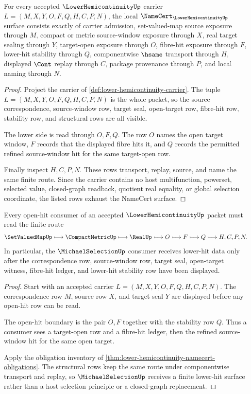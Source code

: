 \begin{theorem}
\label{thm:lower-hemicontinuity-namecert-obligations}
For every accepted $\LowerHemicontinuityUp$ carrier $L=(M,X,Y,O,F,Q,H,C,P,N)$, the local $\NameCert_{\LowerHemicontinuityUp}$ surface consists exactly of carrier admission, set-valued-map source exposure through $M$, compact or metric source-window exposure through $X$, real target sealing through $Y$, target-open exposure through $O$, fibre-hit exposure through $F$, lower-hit stability through $Q$, componentwise $\hsame$ transport through $H$, displayed $\Cont$ replay through $C$, package provenance through $P$, and local naming through $N$.
\end{theorem}
\begin{proof}
Project the carrier of \autoref{def:lower-hemicontinuity-carrier}. The tuple $L=(M,X,Y,O,F,Q,H,C,P,N)$ is the whole packet, so the source correspondence, source-window row, target seal, open-target row, fibre-hit row, stability row, and structural rows are all visible.

The lower side is read through $O,F,Q$. The row $O$ names the open target window, $F$ records that the displayed fibre hits it, and $Q$ records the permitted refined source-window hit for the same target-open row.

Finally inspect $H,C,P,N$. These rows transport, replay, source, and name the same finite route. Since the carrier contains no host multifunction, powerset, selected value, closed-graph readback, quotient real equality, or global selection coordinate, the listed rows exhaust the NameCert surface.
\end{proof}

\begin{theorem}
\label{thm:lower-hemicontinuity-open-hit-stability}
Every open-hit consumer of an accepted $\LowerHemicontinuityUp$ packet must read the finite route
$$
\SetValuedMapUp \longmapsto \CompactMetricUp \longmapsto \RealUp \longmapsto O \longmapsto F \longmapsto Q \longmapsto H,C,P,N .
$$
In particular, the $\MichaelSelectionUp$ consumer receives lower-hit data only after the correspondence row, source-window row, target seal, open-target witness, fibre-hit ledger, and lower-hit stability row have been displayed.
\end{theorem}
\begin{proof}
Start with an accepted carrier $L=(M,X,Y,O,F,Q,H,C,P,N)$. The correspondence row $M$, source row $X$, and target seal $Y$ are displayed before any open-hit row can be read.

The open-hit boundary is the pair $O,F$ together with the stability row $Q$. Thus a consumer sees a target-open row and a fibre-hit ledger, then the refined source-window hit for the same open target.

Apply the obligation inventory of \autoref{thm:lower-hemicontinuity-namecert-obligations}. The structural rows keep the same route under componentwise transport and replay, so $\MichaelSelectionUp$ receives a finite lower-hit surface rather than a host selection principle or a closed-graph replacement.
\end{proof}

